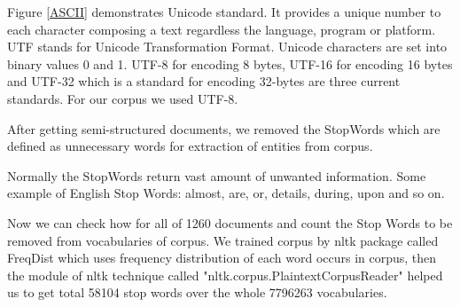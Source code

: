Figure \ref{ASCII} demonstrates Unicode  standard.
It provides  a unique number to each character composing a text regardless the language, program  or platform.
UTF stands for Unicode Transformation Format. Unicode characters are set into binary values 0 and 1. UTF-8 for encoding  8 bytes, UTF-16 for encoding 16 bytes and UTF-32 which is a standard for encoding 32-bytes are three current standards.
For our corpus we used UTF-8.

After getting semi-structured documents, we removed the StopWords
which are defined as unnecessary words for extraction of entities from corpus.

Normally the StopWords return vast amount of unwanted information. Some example of English Stop Words: almost, are, or,  details, during, upon and so on.

Now we can check how for all of 1260 documents and count the Stop Words to be removed from vocabularies of corpus. We trained corpus by nltk package called FreqDist which uses  frequency distribution of each word occurs in corpus, then the module of nltk technique called "nltk.corpus.PlaintextCorpusReader" helped us to get total 58104 stop words over the whole  7796263  vocabularies.

